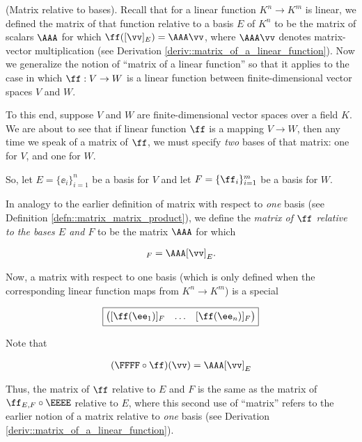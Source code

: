 \begin{defn}
\label{defn::matrix_wrt_bases}

    (Matrix relative to bases). Recall that for a linear function $K^n \rightarrow K^m$ is linear, we defined the matrix of that function relative to a basis $E$ of $K^n$ to be the matrix of scalars $\AAA$ for which $\ff([\vv]_E) = \AAA \vv$, where $\AAA \vv$ denotes matrix-vector multiplication (see Derivation \ref{deriv::matrix_of_a_linear_function}). Now we generalize the notion of ``matrix of a linear function'' so that it applies to the case in which $\ff:V \rightarrow W$ is a linear function between finite-dimensional vector spaces $V$ and $W$.
    
    To this end, suppose $V$ and $W$ are finite-dimensional vector spaces over a field $K$. We are about to see that if linear function $\ff$ is a mapping $V \rightarrow W$, then any time we speak of a matrix of $\ff$, we must specify \textit{two} bases of that matrix: one for $V$, and one for $W$. 
    
    So, let $E = \{\ee_i\}_{i = 1}^n$ be a basis for $V$ and let $F = \{\ff_i\}_{i = 1}^m$ be a basis for $W$.
    
    In analogy to the earlier definition of matrix with respect to \textit{one} basis (see Definition \ref{defn::matrix_matrix_product}), we define the \textit{matrix of $\ff$ relative to the bases $E$ and $F$} to be the matrix $\AAA$ for which
    
    \begin{align*}
        [f(\vv)]_F = \AAA [\vv]_E.
    \end{align*}
    
    Now, a matrix with respect to one basis (which is only defined when the corresponding linear function maps from $K^n \rightarrow K^m$) is a special 
    
    \begin{align*}
        \boxed
        {
            \begin{pmatrix} 
                [\ff(\ee_1)]_F & \hdots & [\ff(\ee_n)]_F
            \end{pmatrix}
        }
    \end{align*}
    
    Note that
    
    \begin{align*}
        (\FFFF \circ \ff)(\vv) = \AAA [\vv]_E
    \end{align*}
    
    Thus, the matrix of $\ff$ relative to $E$ and $F$ is the same as the matrix of $\ff_{E,F} \circ \EEEE$ relative to $E$, where this second use of ``matrix'' refers to the earlier notion of a matrix relative to \textit{one} basis (see Derivation \ref{deriv::matrix_of_a_linear_function}).
\end{defn}

